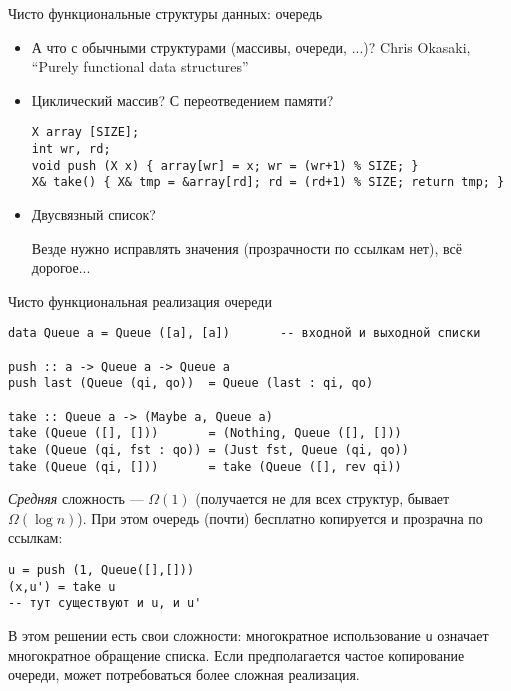 \documentclass[aspectratio=169]{beamer}
\begin{document}

\begin{frame}[fragile]{Чисто функциональные структуры данных: очередь}
\begin{itemize}
\item А что с обычными структурами (массивы, очереди, ...)?
 Chris Okasaki, ``Purely functional data structures''

\item Циклический массив? С переотведением памяти?
\begin{verbatim}
X array [SIZE];
int wr, rd;
void push (X x) { array[wr] = x; wr = (wr+1) % SIZE; }
X& take() { X& tmp = &array[rd]; rd = (rd+1) % SIZE; return tmp; }
\end{verbatim}

\item Двусвязный список? 

Везде нужно исправлять значения (прозрачности по ссылкам нет), всё дорогое...
\end{itemize}
\end{frame}

\begin{frame}[fragile]{Чисто функциональная реализация очереди}
\small
\begin{verbatim}
data Queue a = Queue ([a], [a])       -- входной и выходной списки

push :: a -> Queue a -> Queue a
push last (Queue (qi, qo))  = Queue (last : qi, qo)

take :: Queue a -> (Maybe a, Queue a)
take (Queue ([], []))       = (Nothing, Queue ([], []))
take (Queue (qi, fst : qo)) = (Just fst, Queue (qi, qo))
take (Queue (qi, []))       = take (Queue ([], rev qi))
\end{verbatim}

\normalsize
\emph{Средняя} сложность --- $\Omega(1)$ (получается не для всех структур, бывает $\Omega(\log n)$).
При этом очередь (почти) бесплатно копируется и прозрачна по ссылкам:

\small
\begin{verbatim}
u = push (1, Queue([],[]))
(x,u') = take u
-- тут существуют и u, и u'
\end{verbatim}
\normalsize
В этом решении есть свои сложности: многократное использование \verb!u! означает 
многократное обращение списка. Если предполагается частое копирование очереди,
может потребоваться более сложная реализация.
\end{frame}
\end{document}
